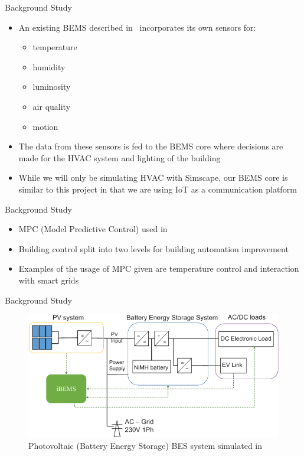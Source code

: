 \documentclass{beamer}
\begin{document}
\begin{frame}{Background Study}{}
    \begin{itemize} %
        \item An existing BEMS described in~\cite{Mataloto2019} incorporates its own sensors for:
        \begin{itemize}
            \item temperature
            \item humidity
            \item luminosity
            \item air quality
            \item motion
        \end{itemize}
        \item The data from these sensors is fed to the BEMS core where decisions are made for the HVAC system and lighting of the building
        \item While we will only be simulating HVAC with Simscape, our BEMS core is similar to this project in that we are using IoT as a communication platform
    \end{itemize}
\end{frame}

\begin{frame}{Background Study}{}
\begin{itemize}
    \item MPC (Model Predictive Control) used in~\cite{Mayer2017} 
    \item Building control split into two levels for building automation improvement
    \item Examples of the usage of MPC given are temperature control and interaction with smart grids
\end{itemize}    
\end{frame}

\begin{frame}{Background Study}{}
\begin{figure}
    \centering
    \includegraphics[scale=0.45]{figs/img/pvBESSystem.png}
    \caption{Photovoltaic (Battery Energy Storage) BES system simulated in \cite{Barchi2018}}
    \label{fig:pvBESSystem}
\end{figure}
\end{frame}
\end{document}
